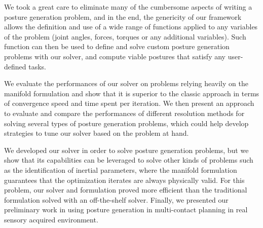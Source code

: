 We took a great care to eliminate many of the cumbersome aspects of writing a posture generation problem, and in the end, the genericity of our framework allows the definition and use of a wide range of functions applied to any variables of the problem (joint angles, forces, torques or any additional variables).
Such function can then be used to define and solve custom posture generation problems with our solver, and compute viable postures that satisfy any user-defined tasks.

We evaluate the performances of our solver on problems relying heavily on the manifold formulation and show that it is superior to the classic approach in terms of convergence speed and time spent per iteration.
We then present an approach to evaluate and compare the performances of different resolution methods for solving several types of posture generation problems, which could help develop strategies to tune our solver based on the problem at hand.

We developed our solver in order to solve posture generation problems, but we show that its capabilities can be leveraged to solve other kinds of problems such as the identification of inertial parameters, where the manifold formulation guarantees that the optimization iterates are always physically valid.
For this problem, our solver and formulation proved more efficient than the traditional formulation solved with an off-the-shelf solver.
Finally, we presented our preliminary work in using posture generation in multi-contact planning in real sensory acquired environment.



